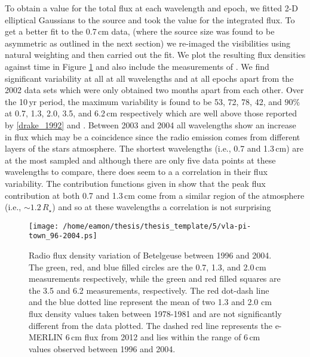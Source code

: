 To obtain a value for the total flux at each wavelength and epoch, we fitted 2-D elliptical Gaussians to the source and took the value for the integrated flux. To get a better fit to the 0.7\,cm data, (where the source size was found to be asymmetric as outlined in the next section) we re-imaged the visibilities using natural weighting and then carried out the fit. We plot the resulting flux densities against time in Figure \ref{fig:5.16} and also include the measurements of \cite{lim_1998}. We find significant variability at all at all wavelengths and at all epochs apart from the 2002 data sets which were only obtained two months apart from each other. Over the 10\,yr period, the maximum variability is found to be 53, 72, 78, 42, and $90\%$ at 0.7, 1.3, 2.0, 3.5, and 6.2\,cm respectively which are well above those reported by \ref{drake_1992} and \cite{bookbinder_1987}. Between 2003 and 2004 all wavelengths show an increase in flux which may be a coincidence since the radio emission comes from different layers of the stars atmosphere. The shortest wavelengths (i.e., 0.7 and 1.3\,cm) are at the most sampled and although there are only five data points at these wavelengths to compare, there does seem to a a correlation in their flux variability. The contribution functions given in \cite{harper_2001} show that the peak flux contribution at both 0.7 and 1.3\,cm come from a similar region of the atmosphere (i.e., $\sim 1.2\,R_{\star}$) and so at these wavelengths a correlation is not surprising

\begin{figure}[hbt!]
\centering
          \texttt{[image: /home/eamon/thesis/thesis\_template/5/vla-pi-town\_96-2004.ps]}
\caption[Radio flux density variation of Betelgeuse between 1996 and 2004.]{Radio flux density variation of Betelgeuse between 1996 and 2004. The green, red, and blue filled circles are the 0.7, 1.3, and 2.0\,cm measurements respectively, while the green and red filled squares are the 3.5 and 6.2 measurements, respectively. The red dot-dash line and the blue dotted line represent the mean of two 1.3 and 2.0 cm flux density values taken between 1978-1981 and are not significantly different from the data plotted. The dashed red line represents the e-MERLIN 6\,cm flux from 2012 and lies within the range of 6\,cm values observed between 1996 and 2004.}
\label{fig:5.16}
\end{figure}

